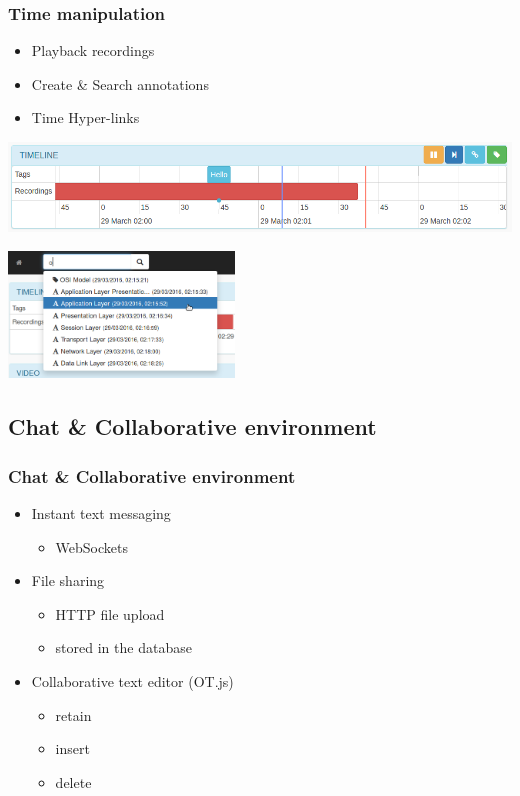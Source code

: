 \documentclass[compress]{beamer}
\begin{document}
		\begin{frame}[c]
		\frametitle{Time manipulation}


		\begin{itemize}
		\item Playback recordings
		\item Create \& Search annotations
		\item Time Hyper-links
		\end{itemize}

			\includegraphics[width=\textwidth]{figures/timeline.png}
				\begin{flushright}

			\vspace*{-12\baselineskip}
			\includegraphics[width=0.45\textwidth]{figures/search.png}
		\end{flushright}
		

		\end{frame}


\subsection{Chat \& Collaborative environment}

		\begin{frame}[c]
		\frametitle{Chat \& Collaborative environment}


		\begin{itemize}
		\item Instant text messaging
			\begin{itemize}
			\item WebSockets
			\end{itemize}

		\item File sharing
			\begin{itemize}
			\item HTTP file upload
			\item stored in the database
			\end{itemize}
		
		\item Collaborative text editor (OT.js)
			\begin{itemize}
			\item retain
			\item insert
			\item delete
			\end{itemize}
		

		\end{itemize}
		

		\end{frame}
\end{document}
